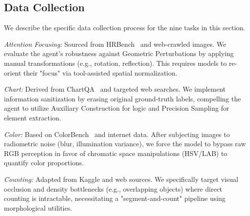 \documentclass[runningheads]{llncs}
\begin{document}

\subsection{Data Collection}\label{app:data_collection}
We describe the specific data collection process for the nine tasks in this section.

\textit{Attention Focusing:} Sourced from HRBench~\cite{wang2025divide} and web-crawled images. We evaluate the agent’s robustness against Geometric Perturbations by applying manual transformations (e.g., rotation, reflection). This requires models to re-orient their "focus" via tool-assisted spatial normalization.

\textit{Chart:} Derived from ChartQA~\cite{masry2022chartqa} and targeted web searches. We implement information sanitization by erasing original ground-truth labels, compelling the agent to utilize Auxiliary Construction for logic and Precision Sampling for element extraction.

\textit{Color:} Based on ColorBench~\cite{liang2025colorbench} and internet data. After subjecting images to radiometric noise (blur, illumination variance), we force the model to bypass raw RGB perception in favor of chromatic space manipulations (HSV/LAB) to quantify color proportions.

\textit{Counting:} Adapted from Kaggle and web sources. We specifically target visual occlusion and density bottlenecks (e.g., overlapping objects) where direct counting is intractable, necessitating a "segment-and-count" pipeline using morphological utilities.
\end{document}
